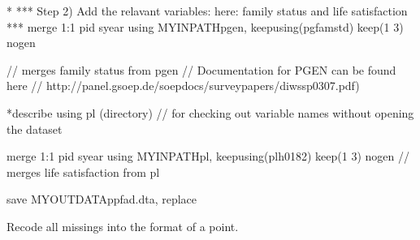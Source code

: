 \documentclass[letterpaper,10pt,openany,onesideH,english]{sphinxmanual}
\begin{document}
%
\begin{sphinxVerbatim}[commandchars=\\\{\},numbers=left,firstnumber=1,stepnumber=1]
*\PYGZhy{}\PYGZhy{}\PYGZhy{}\PYGZhy{}\PYGZhy{}\PYGZhy{}\PYGZhy{}\PYGZhy{}\PYGZhy{}\PYGZhy{}\PYGZhy{}\PYGZhy{}\PYGZhy{}\PYGZhy{}\PYGZhy{}\PYGZhy{}\PYGZhy{}\PYGZhy{}\PYGZhy{}\PYGZhy{}\PYGZhy{}\PYGZhy{}\PYGZhy{}\PYGZhy{}\PYGZhy{}\PYGZhy{}\PYGZhy{}\PYGZhy{}\PYGZhy{}\PYGZhy{}\PYGZhy{}\PYGZhy{}\PYGZhy{}\PYGZhy{}\PYGZhy{}\PYGZhy{}\PYGZhy{}\PYGZhy{}\PYGZhy{}\PYGZhy{}\PYGZhy{}\PYGZhy{}\PYGZhy{}\PYGZhy{}\PYGZhy{}\PYGZhy{}\PYGZhy{}\PYGZhy{}\PYGZhy{}\PYGZhy{}\PYGZhy{}\PYGZhy{}\PYGZhy{}\PYGZhy{}\PYGZhy{}\PYGZhy{}\PYGZhy{}\PYGZhy{}\PYGZhy{}\PYGZhy{}\PYGZhy{}\PYGZhy{}\PYGZhy{}\PYGZhy{}\PYGZhy{}\PYGZhy{}\PYGZhy{}\PYGZhy{}\PYGZhy{}\PYGZhy{}\PYGZhy{}\PYGZhy{}\PYGZhy{}\PYGZhy{}\PYGZhy{}\PYGZhy{}\PYGZhy{}\PYGZhy{}\PYGZhy{}
*** Step 2) Add the relavant variables: here: family status and life satisfaction ***
merge 1:1 pid syear using \PYGZdl{}\PYGZob{}MY\PYGZus{}IN\PYGZus{}PATH\PYGZcb{}\PYGZbs{}pgen, keepusing(pgfamstd) keep(1 3) nogen	

		// merges family status from pgen
		// Documentation for PGEN can be found here
		// http://panel.gsoep.de/soep\PYGZhy{}docs/surveypapers/diw\PYGZus{}ssp0307.pdf)

		
*describe using pl (directory)
		// for checking out variable names without opening the dataset
		
merge 1:1 pid syear using \PYGZdl{}\PYGZob{}MY\PYGZus{}IN\PYGZus{}PATH\PYGZcb{}\PYGZbs{}pl, keepusing(plh0182) keep(1 3) nogen
		// merges life satisfaction from pl 

save \PYGZdl{}MY\PYGZus{}OUT\PYGZus{}DATA\PYGZbs{}ppfad.dta, replace
\end{sphinxVerbatim}


Recode all missings into the format of a point.
\end{document}
